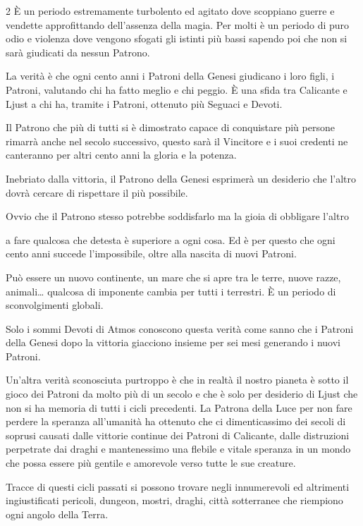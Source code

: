 \begin{multicols}{2}
È un periodo estremamente turbolento ed agitato dove scoppiano guerre e vendette approfittando dell'assenza della magia. Per molti è un periodo di puro odio e violenza dove vengono sfogati gli istinti più bassi sapendo poi che non si sarà giudicati da nessun Patrono.

La verità è che ogni cento anni i Patroni della Genesi giudicano i loro figli, i Patroni, valutando chi ha fatto meglio e chi peggio. È una sfida tra Calicante e Ljust a chi ha, tramite i Patroni, ottenuto più Seguaci e Devoti.

Il Patrono che più di tutti si è dimostrato capace di conquistare più persone rimarrà anche nel secolo successivo, questo sarà il Vincitore e i suoi credenti ne canteranno per altri cento anni la gloria e la potenza.

Inebriato dalla vittoria, il Patrono della Genesi esprimerà un desiderio che l'altro dovrà cercare di rispettare il più possibile.

Ovvio che il Patrono stesso potrebbe soddisfarlo ma la gioia di obbligare l'altro

\begin{figure}

	\centering
\end{figure}

a fare qualcosa che detesta è superiore a ogni cosa. Ed è per questo che ogni cento anni succede l'impossibile, oltre alla nascita di nuovi Patroni.

Può essere un nuovo continente, un mare che si apre tra le terre, nuove razze, animali… qualcosa di imponente cambia per tutti i terrestri. È un periodo di sconvolgimenti globali.

Solo i sommi Devoti di Atmos conoscono questa verità come sanno che i Patroni della Genesi dopo la vittoria giacciono insieme per sei mesi generando i nuovi Patroni.

Un'altra verità sconosciuta purtroppo è che in realtà il nostro pianeta è sotto il gioco dei Patroni da molto più di un secolo e che è solo per desiderio di Ljust che non si ha memoria di tutti i cicli precedenti. La Patrona della Luce per non fare perdere la speranza all'umanità ha ottenuto che ci dimenticassimo dei secoli di soprusi causati dalle vittorie continue dei Patroni di Calicante, dalle distruzioni perpetrate dai draghi e mantenessimo una flebile e vitale speranza in un mondo che possa essere più gentile e amorevole verso tutte le sue creature.

Tracce di questi cicli passati si possono trovare negli innumerevoli ed altrimenti ingiustificati pericoli, dungeon, mostri, draghi, città sotterranee che riempiono ogni angolo della Terra.

\end{multicols}

\pagebreak

